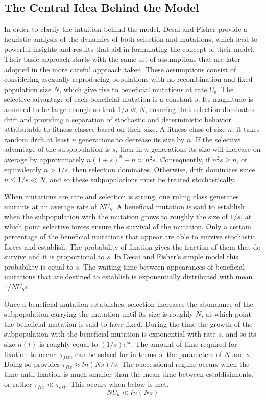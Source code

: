 \documentclass[12pt]{article}
\begin{document}
\subsection*{The Central Idea Behind the Model}
In order to clarify the intuition behind the model, Desai and Fisher provide a heuristic analysis of the dynamics of both selection and mutations, which lead to powerful insights and results that aid in formulating the concept of their model.  Their basic approach starts with the same set of assumptions that are later adopted in the more careful approach taken.  These assumptions consist of considering asexually reproducing populations with no recombination and fixed population size $N$, which give rise to beneficial mutations at rate $U_b$.  The selective advantage of each beneficial mutation is a constant $s$.  Its magnitude is assumed to be large enough so that $1/s \ll N$, ensuring that selection dominates drift and providing a separation of stochastic and deterministic behavior attributable to fitness classes based on their size.  A fitness class of size $n$, it takes random drift at least $n$ generations to decrease its size by $n$.  If the selective advantage of the subpopulation is $s$, then in $n$ generations its size will increase on average by approximately $n(1+s)^n-n \approx n^2s$.  Consequently, if $n^2s \ge n$, or equivalently $n>1/s$, then selection dominates.  Otherwise, drift dominates since $n \leq 1/s \ll N$, and so these subpopulations must be treated stochastically.

When mutations are rare and selection is strong, one ruling class generates mutants at an average rate of $N U_b$.  A beneficial mutation is said to establish when the subpopulation with the mutation grows to roughly the size of $1/s$, at which point selective forces ensure the survival of the mutation.  Only a certain percentage of the beneficial mutations that appear are able to survive stochastic forces and establish.  The probability of fixation gives the fraction of them that do survive and it is proportional to $s$.  In Desai and Fisher's simple model this probability is equal to $s$.  The waiting time between appearances of beneficial mutations that are destined to establish is exponentially distributed with mean $1/NU_b s$.  

Once a beneficial mutation establishes, selection increases the abundance of the subpopulation carrying the mutation until its size is roughly $N$, at which point the beneficial mutation is said to have fixed.  During the time the growth of the subpopulation with the beneficial mutation is exponential with rate $s$, and so its   size $n(t)$ is roughly equal to  $(1/s) e^{st}$.  The amount of time required for fixation to occur,  $\tau_{fix}$, can be solved for in terms of the parameters of $N$ and $s$.  Doing so provides $\tau_{fix} \approx ln(Ns)/s$.  The successional regime occurs when the time until fixation is much smaller than the mean time between establishments, or rather $\tau_{fix} \ll \tau_{est}$.  This occurs when below is met.
\[ N U_b \ll ln(Ns) \] 
\end{document}
